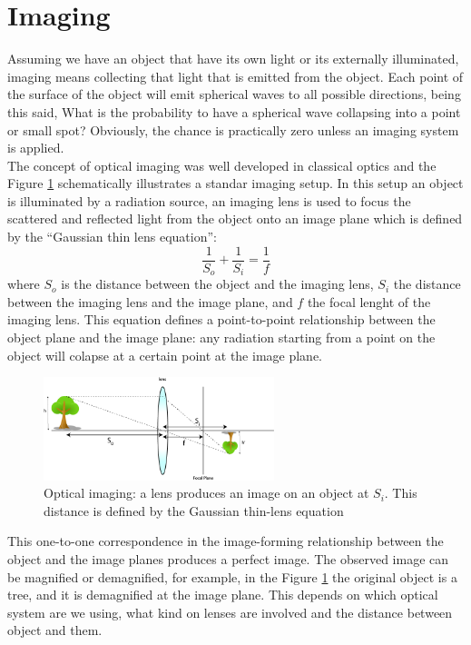 \section{Imaging}

Assuming we have an object that have its own light or its externally illuminated,
imaging means collecting that light that is emitted from the object. Each point
of the surface of the object will emit spherical waves to all possible directions,
being this said, What is the probability to have a spherical wave collapsing into a point or small spot? 
Obviously, the chance is practically zero unless an imaging system is applied.
\\
The concept of optical imaging was well developed in classical optics and the Figure
\ref{fig:imaging} schematically illustrates a standar imaging setup. In this setup 
an object is illuminated by a radiation source, an imaging lens is used 
to focus the scattered and reflected light from the object onto an image plane 
which is defined by the “Gaussian thin lens equation”\cite{hecht}:
\begin{equation}
\frac{1}{S_o}+\frac{1}{S_i}=\frac{1}{f}
\end{equation}
 where $S_o$ is the distance between the object and the imaging lens, $S_i$ the distance 
between the imaging lens and the image plane, and $f$ the focal lenght of the imaging lens. This equation defines
a point-to-point relationship between the object plane and the image plane: any radiation starting from a point on the object will colapse at a certain point at the image plane.
\\
\begin{figure}[h!]
\centering
\includegraphics[width=0.6\textwidth]{Figures/imaging.png}
\caption{Optical imaging: a lens produces an image on an object at $S_i$. This distance is defined
by the Gaussian thin-lens equation} 
\label{fig:imaging}
\end{figure}
This one-to-one correspondence in the image-forming relationship between the object and the image planes produces a perfect image.
The observed image can be magnified or demagnified, for example, in the 
Figure \ref{fig:imaging} the original object is a tree, and it is demagnified at the image plane. This depends on which optical 
system are we using, what kind on lenses are involved and the distance between object and them.

